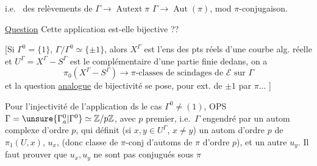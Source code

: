 i.e.\  des relèvements de $\Gamma\longrightarrow\operatorname{Autext}\pi$  $\Gamma\longrightarrow\operatorname{Aut}(\pi)$, mod $\pi$-conjugaison.

\uline{Question}  Cette application est-elle bijective ??

[Si $\Gamma^0=\{1\}$, $\Gamma/\Gamma^0\simeq\{\pm1\}$, alors $X^\Gamma$ est l'ens des pts réels d'une courbe alg. réelle et $U^\Gamma=X^\Gamma-S^\Gamma$ est le complémentaire d'une partie finie dedans, on a
\[
\pi_0(X^\Gamma-S^\Gamma)\longrightarrow
\pi\text{-classes de scindages de }\mathcal E\text{ sur }\Gamma
\]
et la  question \uline{analogue} de bijectivité se pose, pour ext. de $\pm1$ par $\pi$... ]

Pour l'injectivité de l'application ds le cas $\Gamma^0\ne(1)$, OPS $\Gamma=\unsure{\Gamma^0_a|\Gamma^0}\simeq\mathbb Z/p\mathbb Z$, avec $p$ premier, i.e.\ $\Gamma$ engendré par un autom complexe  d'ordre $p$, qui définit (si $x,y\in U^\Gamma$, $x\ne y$) un autom d'ordre $p$ de $\pi_1(U,x)$,  $u_x$,   (donc classe de $\pi$-conj d'automs de $\pi$ d'ordre $p$), et un autre $u_y$.
Il faut prouver que $u_x,u_y$ ne sont pas conjugués sous $\pi$

